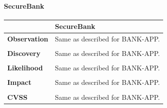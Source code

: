 \paragraph{SecureBank} \mbox{}
\begin{longtable*}{p{.20\textwidth} | p{.80\textwidth}}
    \hline
    & \textbf{SecureBank} \\
    \hline
    \textbf{Observation} &
       Same as described for BANK-APP.
    \\\\
    \textbf{Discovery} &
    Same as described for BANK-APP.
    \\\\
    \textbf{Likelihood} &
        Same as described for BANK-APP.
    \\\\
    \textbf{Impact} &
        Same as described for BANK-APP.
    \\\\
    \textbf{CVSS} &
        Same as described for BANK-APP.
    \\
    \hline
\end{longtable*}
\clearpage